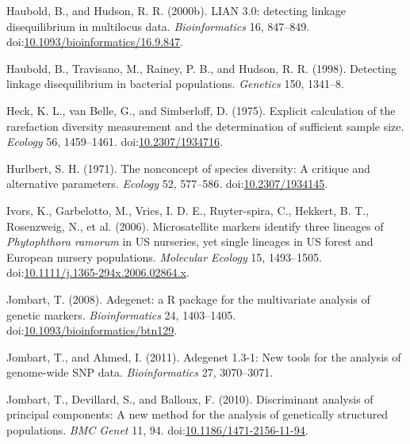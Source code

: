 \documentclass[double,12pt]{beavtex}
\begin{document}
  \hypertarget{ref-Haubold:2000}{}
  Haubold, B., and Hudson, R. R. (2000b). LIAN 3.0: detecting linkage
  disequilibrium in multilocus data. \emph{Bioinformatics} 16, 847--849.
  doi:\href{https://doi.org/10.1093/bioinformatics/16.9.847}{10.1093/bioinformatics/16.9.847}.
  
  \hypertarget{ref-haubold1998detecting}{}
  Haubold, B., Travisano, M., Rainey, P. B., and Hudson, R. R. (1998).
  Detecting linkage disequilibrium in bacterial populations.
  \emph{Genetics} 150, 1341--8.
  
  \hypertarget{ref-heck1975explicit}{}
  Heck, K. L., van Belle, G., and Simberloff, D. (1975). Explicit
  calculation of the rarefaction diversity measurement and the
  determination of sufficient sample size. \emph{Ecology} 56, 1459--1461.
  doi:\href{https://doi.org/10.2307/1934716}{10.2307/1934716}.
  
  \hypertarget{ref-hurlbert1971nonconcept}{}
  Hurlbert, S. H. (1971). The nonconcept of species diversity: A critique
  and alternative parameters. \emph{Ecology} 52, 577--586.
  doi:\href{https://doi.org/10.2307/1934145}{10.2307/1934145}.
  
  \hypertarget{ref-ivors2006microsatellite}{}
  Ivors, K., Garbelotto, M., Vries, I. D. E., Ruyter-spira, C., Hekkert,
  B. T., Rosenzweig, N., et al. (2006). Microsatellite markers identify
  three lineages of \emph{Phytophthora ramorum} in US nurseries, yet
  single lineages in US forest and European nursery populations.
  \emph{Molecular Ecology} 15, 1493--1505.
  doi:\href{https://doi.org/10.1111/j.1365-294x.2006.02864.x}{10.1111/j.1365-294x.2006.02864.x}.
  
  \hypertarget{ref-Jombart_2008}{}
  Jombart, T. (2008). Adegenet: a R package for the multivariate analysis
  of genetic markers. \emph{Bioinformatics} 24, 1403--1405.
  doi:\href{https://doi.org/10.1093/bioinformatics/btn129}{10.1093/bioinformatics/btn129}.
  
  \hypertarget{ref-jombart2011adegenet}{}
  Jombart, T., and Ahmed, I. (2011). Adegenet 1.3-1: New tools for the
  analysis of genome-wide SNP data. \emph{Bioinformatics} 27, 3070--3071.
  
  \hypertarget{ref-jombart2010discriminant}{}
  Jombart, T., Devillard, S., and Balloux, F. (2010). Discriminant
  analysis of principal components: A new method for the analysis of
  genetically structured populations. \emph{BMC Genet} 11, 94.
  doi:\href{https://doi.org/10.1186/1471-2156-11-94}{10.1186/1471-2156-11-94}.
  
\end{document}

